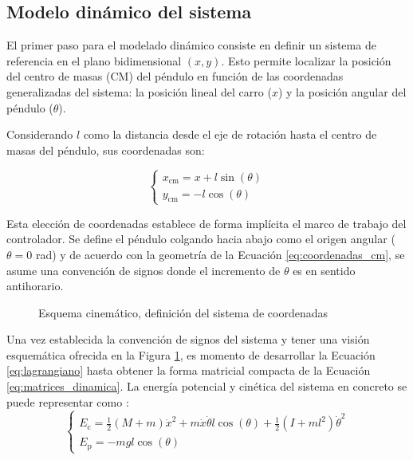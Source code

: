 \documentclass[11pt,fleqn]{book} %
\begin{document}
\subsection{Modelo dinámico del sistema}
\label{cap:modelado_teoria}
El primer paso para el modelado dinámico consiste en definir un sistema de referencia en el plano bidimensional $(x, y)$. Esto permite localizar la posición del centro de masas (CM) del péndulo en función de las coordenadas generalizadas del sistema: la posición lineal del carro ($x$) y la posición angular del péndulo ($\theta$).

Considerando $l$ como la distancia desde el eje de rotación hasta el centro de masas del péndulo, sus coordenadas son:

\begin{equation}
	\begin{cases}
		x_{\text{cm}} = x + l \sin(\theta) \\
		y_{\text{cm}} = -l \cos(\theta)
	\end{cases}\label{eq:coordenadas_cm}
\end{equation}

Esta elección de coordenadas establece de forma implícita el marco de trabajo del controlador. Se define el péndulo colgando hacia abajo como el origen angular ($\theta = 0$ rad) y de acuerdo con la geometría de la Ecuación \ref{eq:coordenadas_cm}, se asume una convención de signos donde el incremento de $\theta$ es en sentido antihorario.


 \begin{figure}[htpb]
 	\centering
	
 	\caption{Esquema cinemático, definición del sistema de coordenadas}
 	\label{fig:esquema_pendulo}
 \end{figure}

\FloatBarrier

Una vez establecida la convención de signos del sistema y tener una visión esquemática ofrecida en la Figura \ref{fig:esquema_pendulo}, es momento de desarrollar la Ecuación \ref{eq:lagrangiano} hasta obtener la forma matricial compacta de la Ecuación \ref{eq:matrices_dinamica}. La energía potencial y cinética del sistema en concreto se puede representar como \cite{tedrake2023}:
\begin{equation}
	\begin{cases}
		E_{\text{c}} = \frac{1}{2}(M + m)\dot{x}^2 + m\dot{x}\dot{\theta} l\cos(\theta) + \frac{1}{2} (I +ml^2)\dot{\theta}^2 \\
		E_{\text{p}} = -mgl\cos(\theta)
	\end{cases}\label{eq:energia_sistema}
\end{equation}
\end{document}
